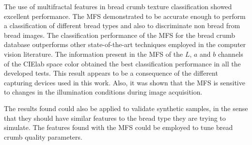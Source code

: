 The use of multifractal features in bread crumb texture classification showed excellent performance. The MFS de\-monstrated to be accurate enough to perform a classification of different bread types and also to discriminate non bread from bread images. The classification performance of the MFS for the bread crumb database outperforms other state-of-the-art techniques employed in the computer vision literature. The information present in the MFS of the $L$, $a$ and $b$ channels of the CIElab space color obtained the best classification performance in all the developed tests. This result appears to be a consequence of the different capturing devices used in this work. Also, it was shown that the MFS is sensitive to changes in the illumination conditions during image acquisition.

The results found could also be applied to validate synthetic samples, in the sense that they should have similar features to the bread type they are trying to simulate. The features found with the MFS could be employed to tune bread crumb quality parameters.


%
%



